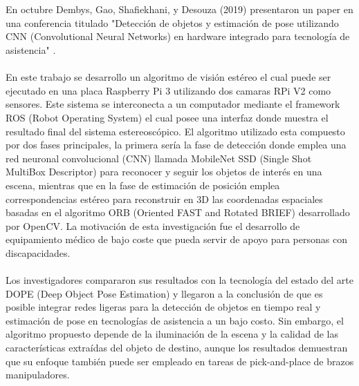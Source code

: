 \\
\\
En octubre Dembys, Gao, Shafiekhani, y Desouza (2019) presentaron un paper en una conferencia titulado "Detección de objetos y estimación de pose utilizando CNN (Convolutional Neural Networks) en hardware integrado para tecnología de asistencia" \cite{AssistiveTech}.
\\
\\
En este trabajo se desarrollo un algoritmo de visión estéreo el cual puede ser ejecutado en una placa Raspberry Pi 3 utilizando dos camaras RPi V2 como sensores. Este sistema se interconecta a un computador mediante el framework ROS (Robot Operating System) el cual posee una interfaz donde muestra el resultado final del sistema estereoscópico. El algoritmo utilizado esta compuesto por dos fases principales, la primera sería la fase de detección donde emplea una red neuronal convolucional (CNN) llamada MobileNet SSD (Single Shot MultiBox Descriptor) para reconocer y seguir los objetos de interés en una escena, mientras que en la fase de estimación de posición emplea correspondencias estéreo para reconstruir en 3D las coordenadas espaciales basadas en el algoritmo ORB (Oriented FAST and Rotated BRIEF) desarrollado por OpenCV. La motivación de esta investigación fue el desarrollo de equipamiento médico de bajo coste que pueda servir de apoyo para personas con discapacidades.
\\
\\
Los investigadores compararon sus resultados con la tecnología del estado del arte DOPE (Deep Object Pose Estimation) y llegaron a la conclusión de que es posible integrar redes ligeras para la detección de objetos en tiempo real y estimación de pose en tecnologías de asistencia a un bajo costo. Sin embargo, el algoritmo propuesto depende de la iluminación de la escena y la calidad de las características extraídas del objeto de destino, aunque los resultados demuestran que su enfoque también puede ser empleado en tareas de pick-and-place de brazos manipuladores.
